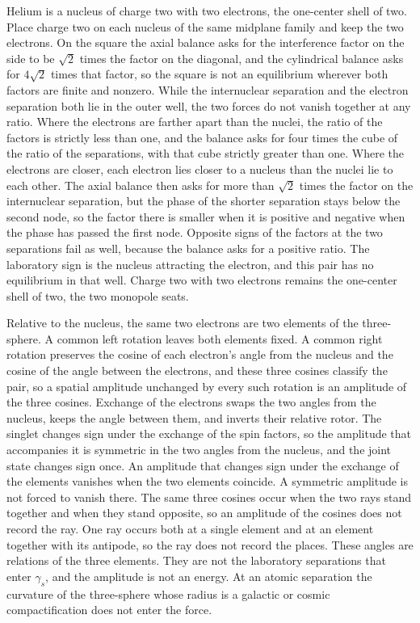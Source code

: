 \documentclass[a4paper]{article}
\begin{document}
Helium is a nucleus of charge two with two electrons, the one-center shell of two. Place charge two on each nucleus of the same midplane family and keep the two electrons. On the square the axial balance asks for the interference factor on the side to be \(\sqrt{2}\) times the factor on the diagonal, and the cylindrical balance asks for \(4\sqrt{2}\) times that factor, so the square is not an equilibrium wherever both factors are finite and nonzero. While the internuclear separation and the electron separation both lie in the outer well, the two forces do not vanish together at any ratio. Where the electrons are farther apart than the nuclei, the ratio of the factors is strictly less than one, and the balance asks for four times the cube of the ratio of the separations, with that cube strictly greater than one. Where the electrons are closer, each electron lies closer to a nucleus than the nuclei lie to each other. The axial balance then asks for more than \(\sqrt{2}\) times the factor on the internuclear separation, but the phase of the shorter separation stays below the second node, so the factor there is smaller when it is positive and negative when the phase has passed the first node. Opposite signs of the factors at the two separations fail as well, because the balance asks for a positive ratio. The laboratory sign is the nucleus attracting the electron, and this pair has no equilibrium in that well. Charge two with two electrons remains the one-center shell of two, the two monopole seats.

Relative to the nucleus, the same two electrons are two elements of the three-sphere. A common left rotation leaves both elements fixed. A common right rotation preserves the cosine of each electron's angle from the nucleus and the cosine of the angle between the electrons, and these three cosines classify the pair, so a spatial amplitude unchanged by every such rotation is an amplitude of the three cosines. Exchange of the electrons swaps the two angles from the nucleus, keeps the angle between them, and inverts their relative rotor. The singlet changes sign under the exchange of the spin factors, so the amplitude that accompanies it is symmetric in the two angles from the nucleus, and the joint state changes sign once. An amplitude that changes sign under the exchange of the elements vanishes when the two elements coincide. A symmetric amplitude is not forced to vanish there. The same three cosines occur when the two rays stand together and when they stand opposite, so an amplitude of the cosines does not record the ray. One ray occurs both at a single element and at an element together with its antipode, so the ray does not record the places. These angles are relations of the three elements. They are not the laboratory separations that enter \(\gamma_s\), and the amplitude is not an energy. At an atomic separation the curvature of the three-sphere whose radius is a galactic or cosmic compactification does not enter the force.
\end{document}
